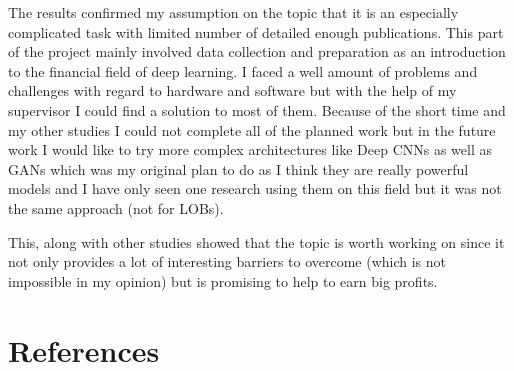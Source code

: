\documentclass[11pt,a4paper,oneside]{article}
\begin{document}
The results confirmed my assumption on the topic that it is an especially complicated task with limited number of 
detailed enough publications. This part of the project mainly involved data collection and preparation as an 
introduction to the financial field of deep learning. I faced a well amount of problems and challenges with regard to 
hardware and software but with the help of my supervisor I could find a solution to most of them. Because of the short 
time and my other studies I could not complete all of the planned work but in the future work I would like to try more
complex architectures like Deep CNNs as well as GANs which was my original plan to do as I think they are really 
powerful models and I have only seen one research using them on this field but it was not the same approach (not for 
LOBs).

This, along with other studies showed that the topic is worth working on since it not only provides a lot of interesting 
barriers to overcome (which is not impossible in my opinion) but is promising to help to earn big profits.

\newpage
\section{References}
\label{sec:references}
\end{document}
